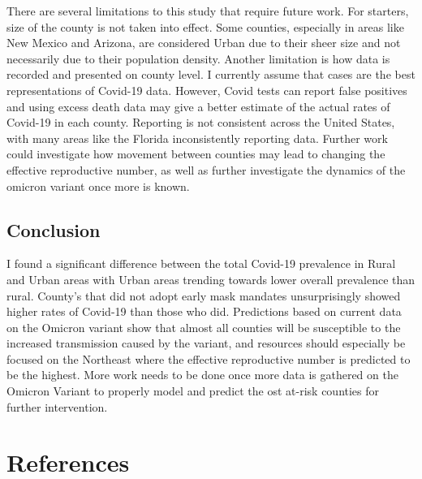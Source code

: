 \documentclass[
  12pt,
]{article}
\begin{document}
There are several limitations to this study that require future work. For starters, size of the county is not taken into effect. Some counties, especially in areas like New Mexico and Arizona, are considered Urban due to their sheer size and not necessarily due to their population density. Another limitation is how data is recorded and presented on county level. I currently assume that cases are the best representations of Covid-19 data. However, Covid tests can report false positives and using excess death data may give a better estimate of the actual rates of Covid-19 in each county. Reporting is not consistent across the United States, with many areas like the Florida inconsistently reporting data. Further work could investigate how movement between counties may lead to changing the effective reproductive number, as well as further investigate the dynamics of the omicron variant once more is known.

\hypertarget{conclusion}{%
\subsection{Conclusion}\label{conclusion}}

I found a significant difference between the total Covid-19 prevalence in Rural and Urban areas with Urban areas trending towards lower overall prevalence than rural. County's that did not adopt early mask mandates unsurprisingly showed higher rates of Covid-19 than those who did. Predictions based on current data on the Omicron variant show that almost all counties will be susceptible to the increased transmission caused by the variant, and resources should especially be focused on the Northeast where the effective reproductive number is predicted to be the highest. More work needs to be done once more data is gathered on the Omicron Variant to properly model and predict the ost at-risk counties for further intervention.

\hypertarget{references}{%
\section{References}\label{references}}
\end{document}
